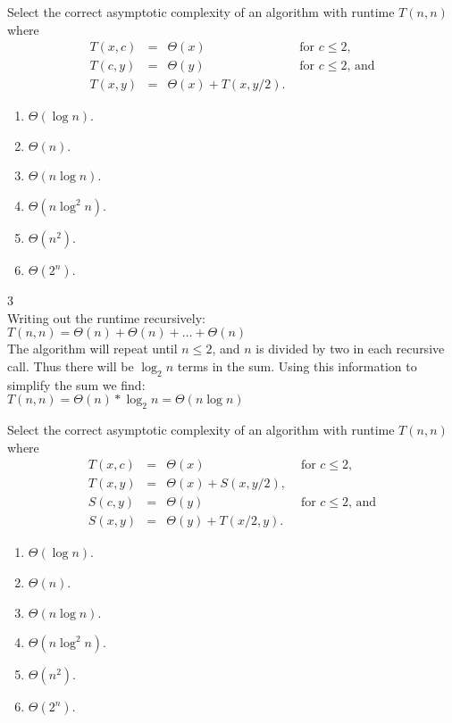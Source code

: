 \documentclass[12pt,twoside]{article}
\begin{document}
\begin{problems}
\begin{problemparts}
\problempart {}
Select the correct asymptotic complexity
of an algorithm with runtime $T(n, n)$
where 
$$
\begin{array}{rcll}
T(x, c) &=& \Theta(x) & \textrm{ for $c \le 2$}, \\
T(c, y) &=& \Theta(y) & \textrm{ for $c \le 2$, and} \\
T(x, y) &=& \Theta(x) + T(x, y / 2).
\end{array}
$$

\begin{enumerate}
\item $\Theta(\log n)$.
\item $\Theta(n)$.
\item $\Theta(n \log n)$.
\item $\Theta(n \log^2 n)$.
\item $\Theta(n^2)$.
\item $\Theta(2^n)$.
\end{enumerate}

\ifsolution \solution{}
3
\\Writing out the runtime recursively:
\\$T(n,n) = \Theta(n) + \Theta(n) + \ldots + \Theta(n)$
\\The algorithm will repeat until $n \leq 2$, and $n$ is divided by two in each recursive call.
Thus there will be $\log_2{n}$ terms in the sum.  Using this information to simplify the sum we find:
\\$T(n,n) = \Theta(n)*\log_2{n} = \Theta(n\log{n})$
\fi

\problempart {}
Select the correct asymptotic complexity
of an algorithm with runtime $T(n, n)$
where 
$$
\begin{array}{rcll}
T(x, c) &=& \Theta(x) & \textrm{ for $c \le 2$}, \\
T(x, y) &=& \Theta(x) + S(x, y / 2), \\
S(c, y) &=& \Theta(y) & \textrm{ for $c \le 2$, and} \\
S(x, y) &=& \Theta(y) + T(x / 2, y).
\end{array}
$$

\begin{enumerate}
\item $\Theta(\log n)$.
\item $\Theta(n)$.
\item $\Theta(n \log n)$.
\item $\Theta(n \log^2 n)$.
\item $\Theta(n^2)$.
\item $\Theta(2^n)$.
\end{enumerate}


\end{problemparts}
\end{problems}
\end{document}
